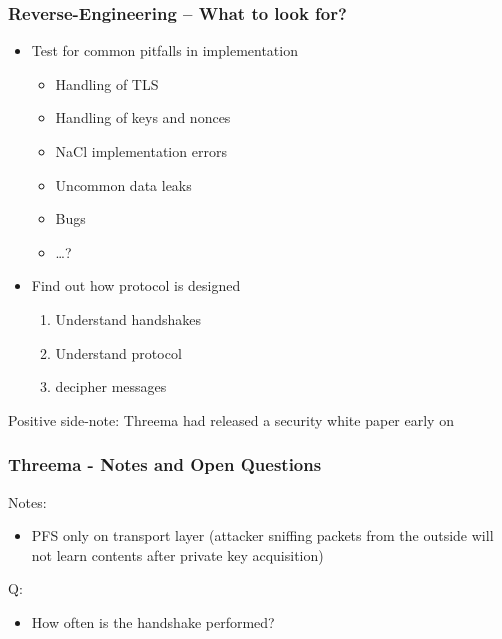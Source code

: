 \documentclass[
	aspectratio=169,
	xetex,
]{beamer}
\begin{document}
\begin{frame}
	\frametitle{Reverse-Engineering -- What to look for?}
\begin{itemize}
	\item Test for common pitfalls in implementation
		\begin{itemize}
			\item Handling of TLS
			\item Handling of keys and nonces
			\item NaCl implementation errors
			\item Uncommon data leaks
			\item Bugs
			\item \ldots?
		\end{itemize}
	\item Find out how protocol is designed
		\begin{enumerate}
			\item Understand handshakes
			\item Understand protocol
			\item decipher messages
		\end{enumerate}
\end{itemize}
\alert{Positive side-note}: Threema had released a security white paper early on
\end{frame}

\begin{frame}
	\frametitle{Threema - Notes and Open Questions}
	Notes:
	\begin{itemize}
		\item PFS only on transport layer (attacker sniffing packets from the outside will not learn contents after private key acquisition)
	\end{itemize}
	Q:
	\begin{itemize}
		\item How often is the handshake performed?
	\end{itemize}
\end{frame}
\end{document}
